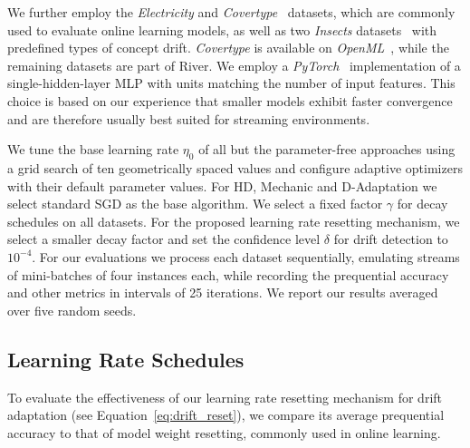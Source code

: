 \documentclass[runningheads]{llncs}
\begin{document}

We further employ the \textit{Electricity} and \textit{Covertype}~\cite{misc_covertype_31} datasets, which are commonly used to evaluate online learning models, as well as two \textit{Insects} datasets~\cite{souzaChallengesBenchmarkingStream2020} with predefined types of concept drift.
\textit{Covertype} is available on \textit{OpenML}~\cite{vanschorenOpenMLNetworkedScience2014}, while the remaining datasets are part of River.
We employ a \textit{PyTorch}~\cite{paszkePyTorchImperativeStyle2019} implementation of a single-hidden-layer MLP with units matching the number of input features.
This choice is based on our experience that smaller models exhibit faster convergence and are therefore usually best suited for streaming environments.

We tune the base learning rate $\eta_0$ of all but the parameter-free approaches using a grid search of ten geometrically spaced values and configure adaptive optimizers with their default parameter values. For HD, Mechanic and D-Adaptation we select standard SGD as the base algorithm.
We select a fixed factor $\gamma$ for decay schedules on all datasets.
For the proposed learning rate resetting mechanism, we select a smaller decay factor and set the confidence level $\delta$ for drift detection to $10^{-4}$.
For our evaluations we process each dataset sequentially, emulating streams of mini-batches of four instances each, while recording the prequential accuracy and other metrics in intervals of 25 iterations.
We report our results averaged over five random seeds.

\subsection{Learning Rate Schedules}

To evaluate the effectiveness of our learning rate resetting mechanism for drift adaptation (see Equation~\eqref{eq:drift_reset}), we compare its average prequential accuracy to that of model weight resetting, commonly used in online learning.
\end{document}
